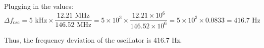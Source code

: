 Plugging in the values:
\[
\Delta f_{\text{osc}} = 5 \text{ kHz} \times \frac{12.21 \text{ MHz}}{146.52 \text{ MHz}} = 5 \times 10^3 \times \frac{12.21 \times 10^6}{146.52 \times 10^6} = 5 \times 10^3 \times 0.0833 = 416.7 \text{ Hz}
\]

Thus, the frequency deviation of the oscillator is 416.7 Hz.

